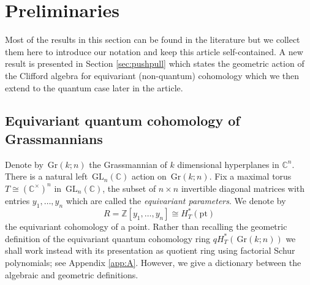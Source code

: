\documentclass[12pt]{amsart}
\newcommand{\Z}{\mathbb{Z}}
\newcommand{\C}{\mathbb{C}}
\newcommand{\GL}{\,\mathrm{GL}}
\newcommand{\Gr}{\,\mathrm{Gr}}
\newcommand{\Hpt}{H^*_T(\mathrm{pt})}
\newcommand{\ring}{R}
\numberwithin{equation}{section}
\numberwithin{figure}{section}
\begin{document}
\section{Preliminaries}
Most of the results in this section can be found in the literature but we collect them here to introduce our notation and keep this article self-contained. A new result is presented in Section \ref{sec:pushpull} which states the geometric action of the Clifford algebra for equivariant (non-quantum) cohomology which we then extend to the quantum case later in the article.

\subsection{Equivariant quantum cohomology of Grassmannians}
Denote by $\Gr(k;n)$ the Grassmannian of $k$ dimensional hyperplanes in $\C^n$. There is a natural left $\GL_n(\C)$ action on $\Gr(k;n)$. Fix a maximal torus $T\cong(\C^\times)^n$ in $\GL_n(\C)$, the subset of $n\times n$ invertible diagonal matrices with entries $y_1,\ldots,y_n$ which are called the {\em equivariant parameters}. We denote by
\[
\ring=\Z[y_1,\ldots,y_n]\cong\Hpt
\]
the equivariant cohomology of a point. Rather than recalling the geometric definition of the equivariant quantum cohomology ring $qH^*_T(\Gr(k;n))$ we shall work instead with its presentation as quotient ring using factorial Schur polynomials; see Appendix \ref{app:A}. However, we give a dictionary between the algebraic and geometric definitions.
\end{document}

